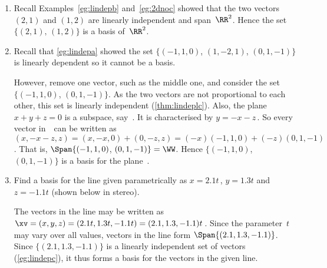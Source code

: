 \begin{example} \label{eg:}
\begin{enumerate}
\item Recall Examples~\ref{eg:lindepb} and~\ref{eg:2dnoc} showed that the two vectors \((2,1)\) and \((1,2)\) are linearly independent and span~\(\RR^2\). 
Hence the set \(\{(2,1),\, (1,2)\}\) is a basis of~\(\RR^2\).

\item Recall that \autoref{eg:lindepa} showed the set \(\{(-1,1,0)\), \((1,-2,1)\), \((0,1,-1)\}\) is linearly dependent so it cannot be a basis.

However, remove one vector, such as the middle one, and consider the set \(\{(-1,1,0)\), \((0,1,-1)\}\).
As the two vectors are not proportional to each other, this set is linearly independent (\autoref{thm:lindeplc}).
Also, the plane \(x+y+z=0\) is a subspace, say~\WW.
It is characterised by \(y=-x-z\)\,.
So every vector in~\WW\ can be written as \((x,-x-z,z)=(x,-x,0)+(0,-z,z)=(-x)(-1,1,0)+(-z)(0,1,-1)\). 
That is, \(\Span\{(-1,1,0)\), \((0,1,-1)\}=\WW\).
Hence \(\{(-1,1,0)\), \((0,1,-1)\}\) is a basis for the plane~\WW.

\item Find a basis for the line given parametrically as \(x=2.1t\)\,, \(y=1.3t\) and \(z=-1.1t\) (shown below in stereo).
\begin{center}
 {}
\end{center}
\begin{solution} 
The vectors in the line may be written as \(\xv=(x,y,z) =(2.1t,1.3t,-1.1t) =(2.1,1.3,-1.1)t\)\,.
Since the parameter~\(t\) may vary over all values, vectors in the line form \(\Span\{(2.1,1.3,-1.1)\}\). 
Since \(\{(2.1,1.3,-1.1)\}\) is a linearly independent set of vectors (\autoref{eg:lindepc}), it thus forms a basis for the vectors in the given line.
\end{solution}



\end{enumerate}
\end{example}
